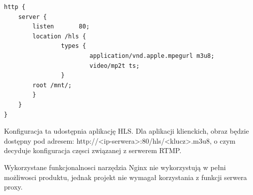 \begin{verbatim}
http {
    server {
        listen       80;
        location /hls {
                types {
                        application/vnd.apple.mpegurl m3u8;
                        video/mp2t ts;
                }
        root /mnt/;
        }
    }
}
\end{verbatim}

Konfiguracja ta udostępnia aplikację HLS. Dla aplikacji klienckich, obraz będzie dostępny pod adresem: http://<ip-serwera>:80/hls/<klucz>.m3u8, o czym decyduje konfiguracja częsci związanej z serwerem RTMP.

Wykorzystane funkcjonalnosci narzędzia Nginx nie wykorzystują w pełni możliwosci produktu, jednak projekt nie wymagał korzystania z funkcji serwera proxy.
